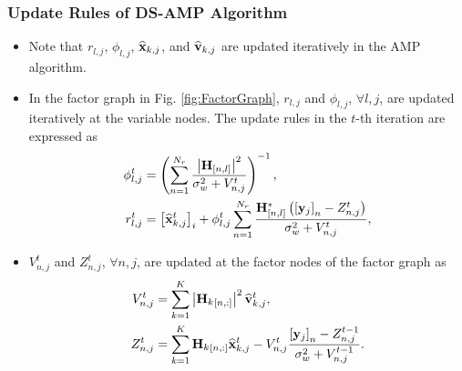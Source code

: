 \documentclass[9pt]{beamer}
\begin{document}
\begin{frame}
\frametitle{Update Rules of DS-AMP Algorithm}
\begin{itemize}
\item
Note that $r_{l,j}$, $\phi_{l,j}$, $\widehat{{\bf x} }_{k,j}$, and $\widehat{{\bf v} }_{k,j}$ are updated iteratively in the AMP algorithm. 
\item
In the factor graph in Fig. \ref{fig:FactorGraph}, $r_{l,j}$ and $\phi_{l,j}$, $\forall l,j$, are updated iteratively at the variable nodes. The update rules in the $t$-th iteration are expressed as
\begin{align}
\label{eq:UpdateSigma} \phi_{l,j}^t&=\left({\sum\limits_{n=1}^{N_r}\dfrac{\left|{\bf H}_{[n,l]}\right|^2}{\sigma_w^2+V_{n,j}^{t}}}\right)^{-1},\\
\label{eq:UpdateR} r_{l,j}^t&=\left[{\widehat{{\bf x}}_{k,j}^t}\right]_i+\phi_{l,j}^t\sum\limits_{n=1}^{N_r}\dfrac{{\bf H}^*_{[n,l]}\left({\left[{{\bf y}_j}\right]_n-Z_{n,j}^t}\right)}{\sigma_w^2+V_{n,j}^{t}},
\end{align}
\item
$V_{n,j}^{t}$ and $Z_{n,j}^t$, $\forall n,j$, are updated at the factor nodes of the factor graph as
\begin{align}
\label{eq:UpdateV} V_{n,j}^t&=\sum\limits_{k=1}^K\left|{{\bf H}_k}_{[{n,:}]}\right|^2\widehat{{\bf v} }_{k,j}^t,\\
\label{eq:UpdateZ} Z_{n,j}^t&=\sum\limits_{k=1}^K{{\bf H}_k}_{[{n,:}]}\widehat{{\bf x} }_{k,j}^t-V_{n,j}^t\dfrac{\left[{{\bf y}_j}\right]_n-Z_{n,j}^{t-1}}{\sigma_w^2+V_{n,j}^{t-1}}.
\end{align}
\end{itemize}
\end{frame}
\end{document}
